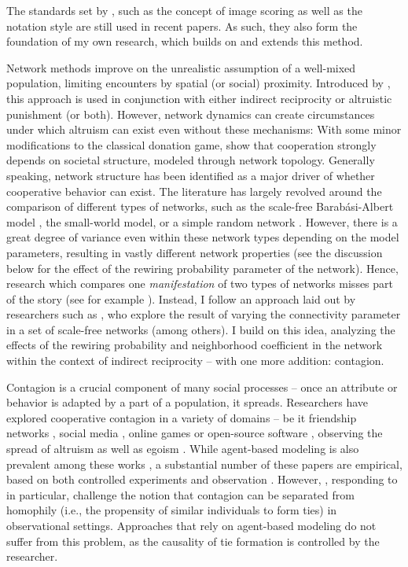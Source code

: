 \documentclass{JASSS}
\begin{document}
The standards set by \cite{Nowak1998}, such as the concept of image scoring as well as the notation style are still used in recent papers. As such, they also form the foundation of my own research, which builds on and extends this method.

Network methods improve on the unrealistic assumption of a well-mixed population, limiting encounters by spatial (or social) proximity. Introduced by \cite{Kearns2001}, this approach is used in conjunction with either indirect reciprocity or altruistic punishment (or both). However, network dynamics can create circumstances under which altruism can exist even without these mechanisms: With some minor modifications to the classical donation game, \citep{Santos2008} show that cooperation strongly depends on societal structure, modeled through network topology. Generally speaking, network structure has been identified as a major driver of whether cooperative behavior can exist. The literature has largely revolved around the comparison of different types of networks, such as the scale-free Barab\'{a}si-Albert model \citep{barabasi1999,Santos2005,Wu2005}, the small-world \cite{Watts1998} model, or a simple random network \citep{Erdos1960}. However, there is a great degree of variance even within these network types depending on the model parameters, resulting in vastly different network properties (see the discussion below for the effect of the rewiring probability parameter of the \cite{Watts1998} network). Hence, research which compares one \textit{manifestation} of two types of networks misses part of the story (see for example \cite{Salazar2011,Peleteiro2014,Shutters2015}). Instead, I follow an approach laid out by researchers such as \cite{Santos2006}, who explore the result of varying the connectivity parameter in a set of scale-free networks (among others). I build on this idea, analyzing the effects of the rewiring probability and neighborhood coefficient in the \cite{Watts1998} network within the context of indirect reciprocity -- with one more addition: contagion.

Contagion is a crucial component of many social processes -- once an attribute or behavior is adapted by a part of a population, it spreads. Researchers have explored cooperative contagion in a variety of domains -- be it friendship networks \citep{Christakis2007}, social media \citep{Centola2010,Bond2012,Rand2015}, online games \citep{Kang2015} or open-source software \citep{Khalak2003}, observing the spread of altruism \citep{Tsvetkova2014} as well as egoism \citep{Ito2016}. While agent-based modeling is also prevalent among these works \citep{Khalak2003, Rand2015}, a substantial number of these papers are empirical, based on both controlled experiments \citep{Centola2010,Tsvetkova2014, Ito2016} and observation \citep{Bond2012,Kang2015}. However, \cite{Shalizi2011}, responding to \cite{Christakis2007} in particular, challenge the notion that contagion can be separated from homophily (i.e., the propensity of similar individuals to form ties) in observational settings. Approaches that rely on agent-based modeling do not suffer from this problem, as the causality of tie formation is controlled by the researcher.
\end{document}
